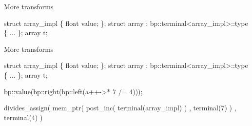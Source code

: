 
\begin{frame}[fragile]{More transforms}
\begin{semiverbatim}
struct array_impl \{ float value; \};
struct array : bp::terminal<array_impl>::type \{ ... \};
array t;












\end{semiverbatim}
\end{frame}


\begin{frame}[fragile]{More transforms}
\begin{semiverbatim}
struct array_impl \{ float value; \};
struct array : bp::terminal<array_impl>::type \{ ... \};
array t;

\alert<8>{bp::value(\alert<6>{bp::right(\alert<4>{bp::left(\alert<2>{\alert<5>{a++->* \alert<7,9>{7}} /= 4})})});}

\alert<3>{divides_assign(
\alert<5>{    mem_ptr(
        post_inc(
            terminal(array_impl)
        )
      , \alert<7>{terminal(\alert<9>{7})}
    )}
  , terminal(4)
)}
\end{semiverbatim}
\end{frame}


